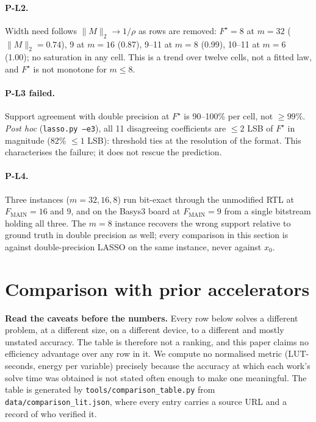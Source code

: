 \documentclass[11pt,a4paper]{article}
\begin{document}
\paragraph{P-L2.} Width need follows $\|M\|_2\to1/\rho$ as rows are removed:
$F^\star=8$ at $m=32$ ($\|M\|_2=0.74$), 9 at $m=16$ (0.87), 9--11 at $m=8$ (0.99),
10--11 at $m=6$ (1.00); no saturation in any cell. This is a trend over twelve
cells, not a fitted law, and $F^\star$ is not monotone for $m\le8$.

\paragraph{P-L3 failed.} Support agreement with double precision at $F^\star$ is
90--100\% per cell, not $\ge99\%$. \emph{Post hoc} (\texttt{lasso.py --e3}), all
11 disagreeing coefficients are $\le2$ LSB of $F^\star$ in magnitude (82\%
$\le1$ LSB): threshold ties at the resolution of the format. This characterises
the failure; it does not rescue the prediction.

\paragraph{P-L4.} Three instances ($m=32,16,8$) run bit-exact through the
unmodified RTL at $F_{\text{MAIN}}=16$ and 9, and on the Basys3 board at
$F_{\text{MAIN}}=9$ from a single bitstream holding all three. The $m=8$ instance recovers the
wrong support relative to ground truth in double precision as well; every
comparison in this section is against double-precision LASSO on the same
instance, never against $x_0$.

\section{Comparison with prior accelerators}
\label{sec:compare}

\textbf{Read the caveats before the numbers.} Every row below solves a
different problem, at a different size, on a different device, to a different
and mostly unstated accuracy. The table is therefore not a ranking, and this
paper claims no efficiency advantage over any row in it. We compute no
normalised metric (LUT-seconds, energy per variable) precisely because the
accuracy at which each work's solve time was obtained is not stated often
enough to make one meaningful. The table is generated by
\texttt{tools/comparison\_table.py} from \texttt{data/comparison\_lit.json},
where every entry carries a source URL and a record of who verified it.
\end{document}
